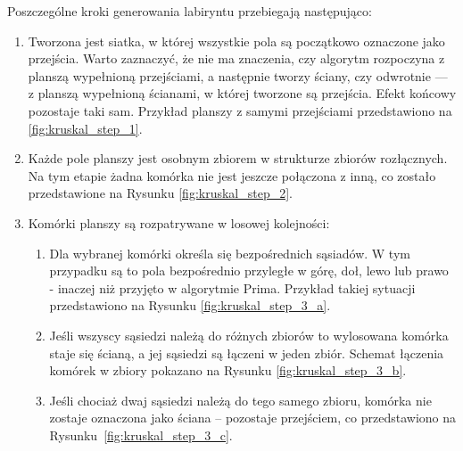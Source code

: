 Poszczególne kroki generowania labiryntu przebiegają następująco:
\begin{enumerate}
    \item Tworzona jest siatka, w której wszystkie pola są początkowo oznaczone jako przejścia. Warto zaznaczyć, że nie ma znaczenia, czy algorytm rozpoczyna z planszą wypełnioną przejściami, a następnie tworzy ściany, czy odwrotnie — z planszą wypełnioną ścianami, w której tworzone są przejścia. Efekt końcowy pozostaje taki sam. Przykład planszy z samymi przejściami przedstawiono na \ref{fig:kruskal_step_1}.

    

    \item Każde pole planszy jest osobnym zbiorem w strukturze zbiorów rozłącznych. Na tym etapie żadna komórka nie jest jeszcze połączona z inną, co zostało przedstawione na Rysunku \ref{fig:kruskal_step_2}.

    

    \item Komórki planszy są rozpatrywane w losowej kolejności:
    \begin{enumerate}
        \item Dla wybranej komórki określa się bezpośrednich sąsiadów. W tym przypadku są to pola bezpośrednio przyległe w górę, doł, lewo lub prawo - inaczej niż przyjęto w algorytmie Prima. Przykład takiej sytuacji przedstawiono na Rysunku \ref{fig:kruskal_step_3_a}.
        
        

        \item Jeśli wszyscy sąsiedzi należą do różnych zbiorów to wylosowana komórka staje się ścianą, a jej sąsiedzi są łączeni w jeden zbiór. Schemat łączenia komórek w zbiory pokazano na Rysunku \ref{fig:kruskal_step_3_b}.

        

        \item Jeśli chociaż dwaj sąsiedzi należą do tego samego zbioru, komórka nie zostaje oznaczona jako ściana – pozostaje przejściem, co przedstawiono na Rysunku~\ref{fig:kruskal_step_3_c}.

        
    \end{enumerate}


\end{enumerate}
